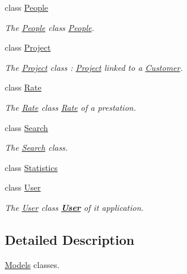 \begin{DoxyCompactItemize}
class \hyperlink{classModels_1_1People}{People}
\begin{DoxyCompactList}\small\item\em The \hyperlink{classModels_1_1People}{People} class \hyperlink{classModels_1_1People}{People}. \end{DoxyCompactList}\item 
class \hyperlink{classModels_1_1Project}{Project}
\begin{DoxyCompactList}\small\item\em The \hyperlink{classModels_1_1Project}{Project} class \-: \hyperlink{classModels_1_1Project}{Project} linked to a \hyperlink{classModels_1_1Customer}{Customer}. \end{DoxyCompactList}\item 
class \hyperlink{classModels_1_1Rate}{Rate}
\begin{DoxyCompactList}\small\item\em The \hyperlink{classModels_1_1Rate}{Rate} class \hyperlink{classModels_1_1Rate}{Rate} of a prestation. \end{DoxyCompactList}\item 
class \hyperlink{classModels_1_1Search}{Search}
\begin{DoxyCompactList}\small\item\em The \hyperlink{classModels_1_1Search}{Search} class. \end{DoxyCompactList}\item 
class \hyperlink{classModels_1_1Statistics}{Statistics}
\item 
class \hyperlink{classModels_1_1User}{User}
\begin{DoxyCompactList}\small\item\em The \hyperlink{classModels_1_1User}{User} class {\bfseries \hyperlink{classModels_1_1User}{User}} of it application. \end{DoxyCompactList}\end{DoxyCompactItemize}


\subsection{Detailed Description}
\hyperlink{namespaceModels}{Models} classes. 